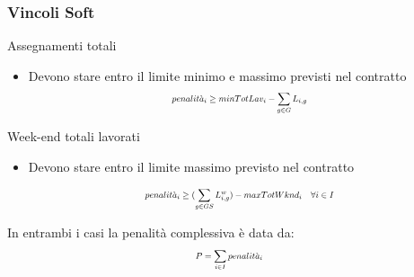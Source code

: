 \documentclass[xcolor={dvipsnames, table}]{beamer}
\newcommand\scalemath[2]{\scalebox{#1}{\mbox{\ensuremath{\displaystyle #2}}}}
\begin{document}
\begin{frame}
	\frametitle{Vincoli Soft}
	\begin{block}{Assegnamenti totali}
	\begin{itemize}
	\item Devono stare entro il limite minimo e massimo previsti nel contratto
	\begin{equation*}
				\scalemath{0.7}{
				\begin{aligned}
				 penalit\grave{a}_i &\geq minTotLav_i - \sum_{g \in G} L_{i, g}
				\end{aligned}
				}
	\end{equation*}
	\end{itemize}
	\end{block}
	\begin{block}{Week-end totali lavorati}
	\begin{itemize}
	\item Devono stare entro il limite massimo previsto nel contratto
	
	\begin{equation*}
				\scalemath{0.7}{
				\begin{aligned}
				penalit\grave{a}_i &\geq (\sum_{g \in GS} L_{i, g}^w ) - maxTotWknd_i ~~~ \forall i \in I
				\end{aligned}
				}
	\end{equation*}
	\end{itemize}
	\end{block}
	In entrambi i casi la penalità complessiva è data da:
	\begin{equation*}
				\scalemath{0.7}{
				\begin{aligned}
				 P &= \sum_{i \in I} penalit\grave{a}_i
				\end{aligned}
				}
	\end{equation*}
	
	
	

\end{frame}
\end{document}
